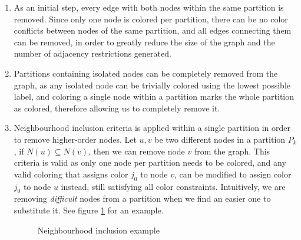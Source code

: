 \begin{enumerate}
	\item{As an initial step, every edge with both nodes within the same partition is removed. Since only one node is colored per partition, there can be no color conflicts between nodes of the same partition, and all edges connecting them can be removed, in order to greatly reduce the size of the graph and the number of adjacency restrictions generated.}
	\item{Partitions containing isolated nodes can be completely removed from the graph, as any isolated node can be trivially colored using the lowest possible label, and coloring a single node within a partition marks the whole partition as colored, therefore allowing us to completely remove it.}
	\item{Neighbourhood inclusion criteria is applied within a single partition in order to remove higher-order nodes. Let $u,v$ be two different nodes in a partition $P_k$, if $N(u) \subseteq N(v)$, then we can remove node $v$ from the graph. This criteria is valid as only one node per partition needs to be colored, and any valid coloring that assigns color $j_0$ to node $v$, can be modified to assign color $j_0$ to node $u$ instead, still satisfying all color constraints. Intuitively, we are removing \textit{difficult} nodes from a partition when we find an easier one to substitute it. See figure \ref{fig:neighbourinclusion} for an example.}
	
\begin{figure}[h]
	\label{fig:neighbourinclusion}
	\centering
\caption{Neighbourhood inclusion example}
\end{figure}
	

\end{enumerate}
